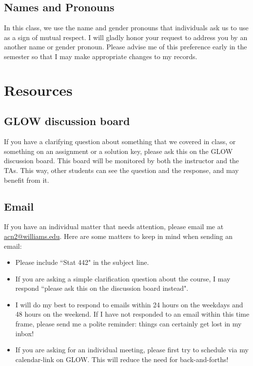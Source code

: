 \documentclass[11pt]{article}
\begin{document}
\subsection{Names and Pronouns}

In this class, we use the name and gender pronouns that individuals ask us to use as a sign of mutual respect. I will gladly honor your request to address you by an another name or gender pronoun. Please advise me of this preference early in the semester so that I may make appropriate changes to my records. %

\section{Resources}

\subsection{GLOW discussion board}

If you have a clarifying question about something that we covered in class, or something on an assignment or a solution key, please ask this on the GLOW discussion board. This board will be monitored by both the instructor and the TAs. This way, other students can see the question and the response, and may benefit from it. 

\subsection{Email}

If you have an individual matter that needs attention, please email me at \url{acn2@williams.edu}. Here are some matters to keep in mind when sending an email:
\begin{itemize}
\item Please include ``Stat 442" in the subject line. 
\item If you are asking a simple clarification question about the course, I may respond ``please ask this on the discussion board instead". 
\item I will do my best to respond to emails within 24 hours on the weekdays and 48 hours on the weekend. If I have not responded to an email within this time frame, please send me a polite reminder: things can certainly get lost in my inbox! 
\item If you are asking for an individual meeting, please first try to schedule via my calendar-link on GLOW. This will reduce the need for back-and-forths! 
\end{itemize}
\end{document}
